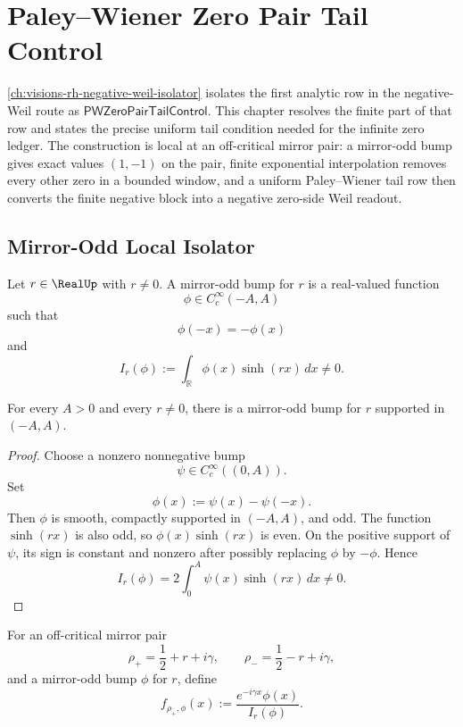 \chapter{Paley--Wiener Zero Pair Tail Control}
\label{ch:visions-rh-pw-zero-pair-tail-control}

\autoref{ch:visions-rh-negative-weil-isolator} isolates the first
analytic row in the negative-Weil route as
$\mathsf{PWZeroPairTailControl}$.  This chapter resolves the finite
part of that row and states the precise uniform tail condition needed
for the infinite zero ledger.  The construction is local at an
off-critical mirror pair: a mirror-odd bump gives exact values
$(1,-1)$ on the pair, finite exponential interpolation removes every
other zero in a bounded window, and a uniform Paley--Wiener tail row
then converts the finite negative block into a negative zero-side Weil
readout.

\section{Mirror-Odd Local Isolator}
\label{sec:rh-pw-zero-pair-mirror-odd-local-isolator}

\begin{definition}
\label{def:rh-mirror-odd-bump}
Let $r\in\RealUp$ with $r\ne0$.  A mirror-odd bump for $r$ is a
real-valued function
$$
\phi\in C_c^\infty(-A,A)
$$
such that
$$
\phi(-x)=-\phi(x)
$$
and
$$
I_r(\phi)
:=
\int_{\mathbb R}\phi(x)\sinh(rx)\,dx
\ne0.
$$
\end{definition}

\begin{lemma}
\label{lem:rh-mirror-odd-bumps-exist}
For every $A>0$ and every $r\ne0$, there is a mirror-odd bump for $r$
supported in $(-A,A)$.
\end{lemma}

\begin{proof}
Choose a nonzero nonnegative bump
$$
\psi\in C_c^\infty((0,A)).
$$
Set
$$
\phi(x):=\psi(x)-\psi(-x).
$$
Then $\phi$ is smooth, compactly supported in $(-A,A)$, and odd.  The
function $\sinh(rx)$ is also odd, so $\phi(x)\sinh(rx)$ is even.  On the
positive support of $\psi$, its sign is constant and nonzero after
possibly replacing $\phi$ by $-\phi$.  Hence
$$
I_r(\phi)
=
2\int_{0}^{A}\psi(x)\sinh(rx)\,dx
\ne0.
$$
\end{proof}

\begin{definition}
\label{def:rh-mirror-odd-zero-pair-row}
For an off-critical mirror pair
$$
\rho_+=\frac12+r+i\gamma,
\qquad
\rho_-=\frac12-r+i\gamma,
$$
and a mirror-odd bump $\phi$ for $r$, define
$$
f_{\rho_+,\phi}(x)
:=
\frac{e^{-i\gamma x}\phi(x)}{I_r(\phi)}.
$$
\end{definition}

